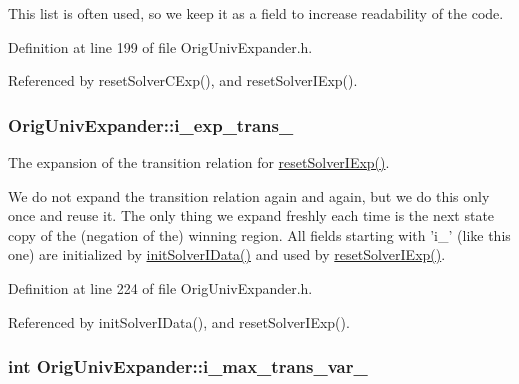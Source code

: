 This list is often used, so we keep it as a field to increase readability of the code. 

Definition at line 199 of file Orig\-Univ\-Expander.\-h.



Referenced by reset\-Solver\-C\-Exp(), and reset\-Solver\-I\-Exp().

\hypertarget{classOrigUnivExpander_a2b2a151446c62688478b7d548fca860c}{
\subsubsection[{i\-\_\-exp\-\_\-trans\-\_\-}]{ Orig\-Univ\-Expander\-::i\-\_\-exp\-\_\-trans\-\_\-\hspace{0.3cm}{\ttfamily [protected]}}}\label{classOrigUnivExpander_a2b2a151446c62688478b7d548fca860c}


The expansion of the transition relation for \hyperlink{classOrigUnivExpander_abcd12e41626b01f53ac7b8c654fa9218}{reset\-Solver\-I\-Exp()}. 

We do not expand the transition relation again and again, but we do this only once and reuse it. The only thing we expand freshly each time is the next state copy of the (negation of the) winning region. All fields starting with 'i\-\_\-' (like this one) are initialized by \hyperlink{classOrigUnivExpander_a1ca430c08a9927733951149db492916e}{init\-Solver\-I\-Data()} and used by \hyperlink{classOrigUnivExpander_abcd12e41626b01f53ac7b8c654fa9218}{reset\-Solver\-I\-Exp()}. 

Definition at line 224 of file Orig\-Univ\-Expander.\-h.



Referenced by init\-Solver\-I\-Data(), and reset\-Solver\-I\-Exp().

\hypertarget{classOrigUnivExpander_a150c22a734df707f76190a66b6eb2a44}{
\subsubsection[{i\-\_\-max\-\_\-trans\-\_\-var\-\_\-}]{\setlength{\rightskip}{0pt plus 5cm}int Orig\-Univ\-Expander\-::i\-\_\-max\-\_\-trans\-\_\-var\-\_\-\hspace{0.3cm}{\ttfamily [protected]}}}\label{classOrigUnivExpander_a150c22a734df707f76190a66b6eb2a44}


